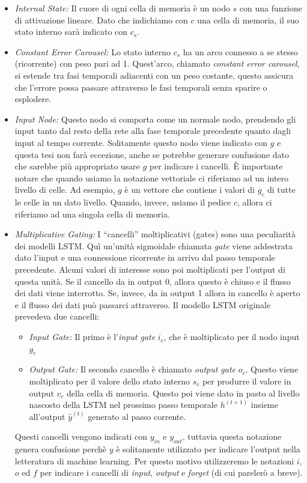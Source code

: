 \begin{itemize}
  \item \emph{Internal State:} Il cuore di ogni cella di memoria \`e un nodo
  $s$ con una funzione di attivazione lineare. Dato che indichiamo con $c$ una
  cella di memoria, il suo stato interno sar\`a indicato con $c_s$.
  \item \emph{Constant Error Carousel:} Lo stato interno $c_s$ ha un arco connesso
  a se stesso (ricorrente) con peso pari ad 1. Quest'arco, chiamato \emph{constant
  error carousel}, si estende tra fasi temporali adiacenti con un peso costante,
  questo assicura che l'errore possa passare attraverso le fasi temporali senza
  sparire o esplodere.
  \item \emph{Input Node:} Questo nodo si comporta come un normale nodo, prendendo
  gli input tanto dal resto della rete alla fase temporale precedente quanto dagli
  input al tempo corrente. Solitamente questo nodo viene indicato con $g$ e questa
  tesi non far\`a eccezione, anche se potrebbe generare confusione dato che sarebbe
  pi\`u appropriato usare $g$ per indicare i cancelli. \`E importante notare che
  quando usiamo la notazione vettoriale ci riferiamo ad un intero livello di celle.
  Ad esempio, $g$ \`e un vettore che contiene i valori di $g_c$ di tutte le celle
  in un dato livello. Quando, invece, usiamo il pedice $c$, allora ci riferiamo
  ad una singola cella di memoria.
  \item \emph{Multiplicative Gating:} I ``cancelli'' moltiplicativi (gates) sono
  una peculiarit\`a dei modelli LSTM. Qu\`i un'unit\`a sigmoidale chiamata \emph{gate}
  viene addestrata dato l'input e una connessione ricorrente in arrivo dal passo
  temporale precedente. Alcuni valori di interesse sono poi moltiplicati per
  l'output di questa unit\`a. Se il cancello da in output 0, allora questo \`e
  chiuso e il flusso dei dati viene interrotto. Se, invece, da in output 1 allora
  in cancello \`e aperto e il flusso dei dati pu\`o passarci attraverso. Il modello
  LSTM originale prevedeva due cancelli:
  \begin{itemize}
    \item \emph{Input Gate:} Il primo \`e l'\emph{input gate} $i_c$, che \`e
    moltiplicato per il nodo input $g_c$
    \item \emph{Output Gate:} Il secondo cancello \`e chiamato \emph{output gate} $o_c$.
    Questo viene moltiplicato per il valore dello stato interno $s_c$ per produrre
    il valore in output $v_c$ della cella di memoria. Questo poi viene dato in
    pasto al livello nascosto della LSTM nel prossimo passo temporale $h^{(t+1)}$
    insieme all'output $\hat{y}^(t)$ generato al passo corrente.
  \end{itemize}
  Questi cancelli vengono indicati con $y_{in}$ e $y_{out}$, tuttavia questa
  notazione genera confusione perch\`e $y$ \`e solitamente utilizzato per indicare
  l'output nella letteratura di machine learning. Per questo motivo utilizzeremo
  le notazioni $i$, $o$ ed $f$ per indicare i cancelli di \emph{input}, \emph{output}
  e \emph{forget} (di cui pareler\`o a breve).
\end{itemize}

